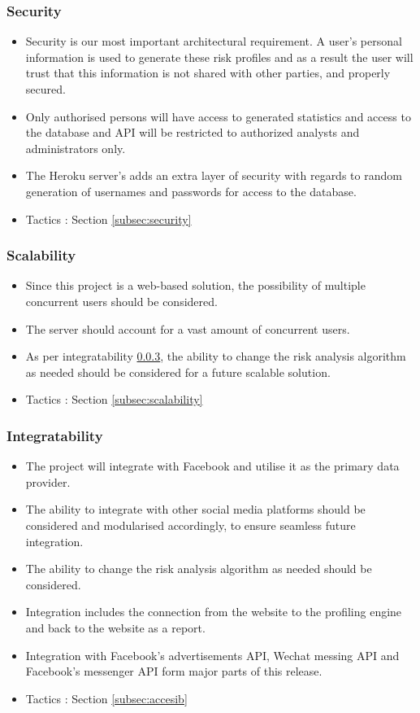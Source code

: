 \documentclass{article}
\begin{document}
		\subsubsection{Security}\label{subsubsec:security}
		\begin{itemize}
			\item Security is our most important architectural requirement. A user's personal information is used to generate these risk profiles and as a result the user will trust that this information is not shared with other parties, and properly secured.
			\item Only authorised persons will have access to generated statistics and access to the database and API will be restricted to authorized analysts and administrators only.
			\item The Heroku server's adds an extra layer of security with regards to random generation of usernames and passwords for access to the database.
			\item Tactics : Section \ref{subsec:security}
		\end{itemize}
		\subsubsection{Scalability}
		\begin{itemize}
			\item Since this project is a web-based solution, the possibility of multiple concurrent users should be considered.
			\item The server should account for a vast amount of concurrent users.
			\item As per integratability \ref{subsubsec:integratability}, the ability to change the risk analysis algorithm as needed should be considered for a future scalable solution.
			\item Tactics : Section \ref{subsec:scalability}
		\end{itemize}

		\subsubsection{Integratability}\label{subsubsec:integratability}
		\begin{itemize}
			\item The project will integrate with Facebook and utilise it as the primary data provider.
			\item The ability to integrate with other social media platforms should be considered and modularised accordingly, to ensure seamless future integration.
			\item The ability to change the risk analysis algorithm as needed should be considered.
			\item Integration includes the connection from the website to the profiling engine and back to the website as a report.
			\item Integration with Facebook's advertisements API, Wechat messing API and  Facebook's messenger API form major parts of this release.
			\item Tactics : Section \ref{subsec:accesib}
		\end{itemize}
\end{document}
